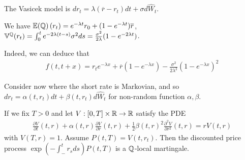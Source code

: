 \begin{defn}
  \label{sec:interest-rate-models-4}
  The Vasicek model is $dr_{t} = \lambda(\overline r - r_{t}) dt +
  \sigma d\hat W_{t}$.

  We have $\E{\Q}(r_{t}) = e^{-\lambda t} r_{0} + (1 - e^{-\lambda t})
  \overline r$, $\Var^{\Q}(r_{t}) = \int_{0}^{t} e^{-2\lambda(t-s)}
  \sigma^{2} ds = \frac{\sigma^{2}}{2\lambda} (1 - e^{-2\lambda t})$.

  Indeed, we can deduce that
  \begin{align}
    \label{eq:28}
    f(t, t + x) = r_{t} e^{-\lambda x} + \overline r(1 - e^{-\lambda
      x}) - \frac{\sigma^{2}}{2 \lambda^{2}} (1 - e^{-\lambda x})^{2}
  \end{align}
\end{defn}

\begin{thm}
  \label{sec:interest-rate-models-5}
  Consider now where the short rate is Markovian, and so $dr_{t} =
  \alpha(t, r_{t}) dt + \beta(t, r_{t}) d \hat W_{t}$ for non-random
  function $\alpha, \beta$.

  If we fix $T > 0$ and let $V: [0, T] \times \mathbb{R} \rightarrow \mathbb{R}$
  satisfy the PDE
  \begin{align}
    \label{eq:29}
    \frac{\partial V}{\partial t}(t, r) + \alpha(t, r) \frac{\partial
      V}{\partial r}(t, r) + \frac{1}{2} \beta(t, r)^{2}
    \frac{\partial^{2} V}{\partial r^{2}}(t, r) = rV(t, r)
  \end{align} with $V(T, r) = 1$.  Assume $P(t, T) = V(t, r_{t})$.
  Then the discounted price process $\exp(-\int_{-}^{t} r_{s} ds) P(t,
  T)$ is a $\Q$-local martingale.
\end{thm}




